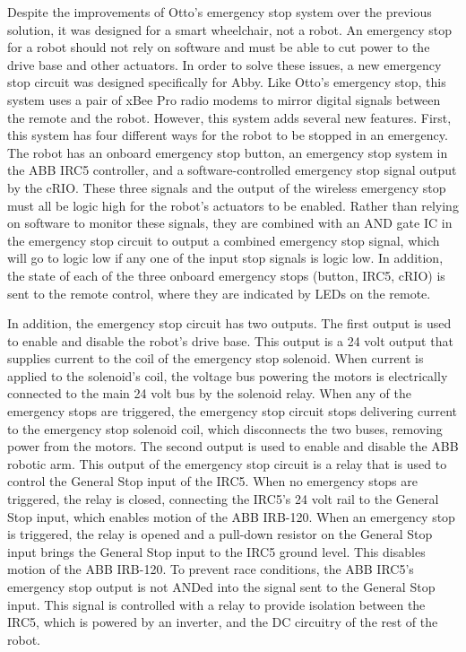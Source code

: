\documentclass{article}
\begin{document}
Despite the improvements of Otto{\textquoteright}s emergency stop system over the previous solution, it was designed for a smart wheelchair, not a robot. An emergency stop for a robot should not rely on software and must be able to cut power to the drive base and other actuators. In order to solve these issues, a new emergency stop circuit was designed specifically for Abby. Like Otto{\textquoteright}s emergency stop, this system uses a pair of xBee Pro radio modems to mirror digital signals between the remote and the robot. However, this system adds several new features. First, this system has four different ways for the robot to be stopped in an emergency. The robot has an onboard emergency stop button, an emergency stop system in the ABB IRC5 controller, and a software-controlled emergency stop signal output by the cRIO. These three signals and the output of the wireless emergency stop must all be logic high for the robot{\textquoteright}s actuators to be enabled. Rather than relying on software to monitor these signals, they are combined with an AND gate IC in the emergency stop circuit to output a combined emergency stop signal, which will go to logic low if any one of the input stop signals is logic low. In addition, the state of each of the three onboard emergency stops (button, IRC5, cRIO) is sent to the remote control, where they are indicated by LEDs on the remote.

In addition, the emergency stop circuit has two outputs. The first output is used to enable and disable the robot{\textquoteright}s drive base. This output is a 24 volt output that supplies current to the coil of the emergency stop solenoid. When current is applied to the solenoid{\textquoteright}s coil, the voltage bus powering the motors is electrically connected to the main 24 volt bus by the solenoid relay. When any of the emergency stops are triggered, the emergency stop circuit stops delivering current to the emergency stop solenoid coil, which disconnects the two buses, removing power from the motors. The second output is used to enable and disable the ABB robotic arm. This output of the emergency stop circuit is a relay that is used to control the General Stop input of the IRC5. When no emergency stops are triggered, the relay is closed, connecting the IRC5{\textquoteright}s 24 volt rail to the General Stop input, which enables motion of the ABB IRB-120. When an emergency stop is triggered, the relay is opened and a pull-down resistor on the General Stop input brings the General Stop input to the IRC5 ground level. This disables motion of the ABB IRB-120. To prevent race conditions, the ABB IRC5{\textquoteright}s emergency stop output is not ANDed into the signal sent to the General Stop input. This signal is controlled with a relay to provide isolation between the IRC5, which is powered by an inverter, and the DC circuitry of the rest of the robot.
\end{document}
